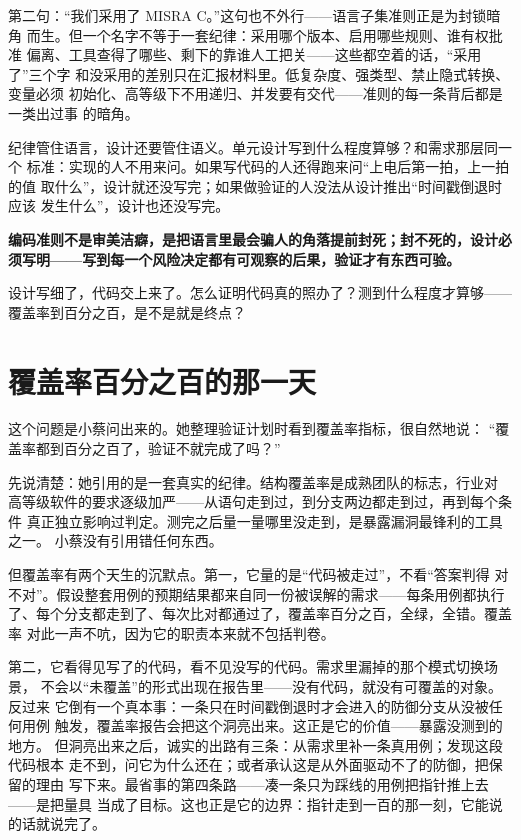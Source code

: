第二句：“我们采用了 MISRA C。”这句也不外行——语言子集准则正是为封锁暗角
而生。但一个名字不等于一套纪律：采用哪个版本、启用哪些规则、谁有权批准
偏离、工具查得了哪些、剩下的靠谁人工把关——这些都空着的话，“采用了”三个字
和没采用的差别只在汇报材料里。低复杂度、强类型、禁止隐式转换、变量必须
初始化、高等级下不用递归、并发要有交代——准则的每一条背后都是一类出过事
的暗角。

纪律管住语言，设计还要管住语义。单元设计写到什么程度算够？和需求那层同一个
标准：实现的人不用来问。如果写代码的人还得跑来问“上电后第一拍，上一拍的值
取什么”，设计就还没写完；如果做验证的人没法从设计推出“时间戳倒退时应该
发生什么”，设计也还没写完。

\textbf{编码准则不是审美洁癖，是把语言里最会骗人的角落提前封死；封不死的，设计必须写明——写到每一个风险决定都有可观察的后果，验证才有东西可验。}

设计写细了，代码交上来了。怎么证明代码真的照办了？测到什么程度才算够——
覆盖率到百分之百，是不是就是终点？

\section{覆盖率百分之百的那一天}

这个问题是小蔡问出来的。她整理验证计划时看到覆盖率指标，很自然地说：
“覆盖率都到百分之百了，验证不就完成了吗？”

先说清楚：她引用的是一套真实的纪律。结构覆盖率是成熟团队的标志，行业对
高等级软件的要求逐级加严——从语句走到过，到分支两边都走到过，再到每个条件
真正独立影响过判定。测完之后量一量哪里没走到，是暴露漏洞最锋利的工具之一。
小蔡没有引用错任何东西。

但覆盖率有两个天生的沉默点。第一，它量的是“代码被走过”，不看“答案判得
对不对”。假设整套用例的预期结果都来自同一份被误解的需求——每条用例都执行
了、每个分支都走到了、每次比对都通过了，覆盖率百分之百，全绿，全错。覆盖率
对此一声不吭，因为它的职责本来就不包括判卷。

第二，它看得见写了的代码，看不见没写的代码。需求里漏掉的那个模式切换场景，
不会以“未覆盖”的形式出现在报告里——没有代码，就没有可覆盖的对象。反过来
它倒有一个真本事：一条只在时间戳倒退时才会进入的防御分支从没被任何用例
触发，覆盖率报告会把这个洞亮出来。这正是它的价值——暴露没测到的地方。
但洞亮出来之后，诚实的出路有三条：从需求里补一条真用例；发现这段代码根本
走不到，问它为什么还在；或者承认这是从外面驱动不了的防御，把保留的理由
写下来。最省事的第四条路——凑一条只为踩线的用例把指针推上去——是把量具
当成了目标。这也正是它的边界：指针走到一百的那一刻，它能说的话就说完了。

